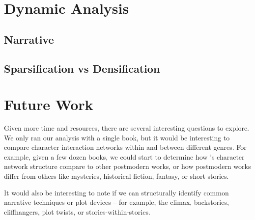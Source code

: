 \section{Dynamic Analysis}

\subsection{Narrative}

\subsection{Sparsification vs Densification}

\section{Future Work}

Given more time and resources, there are several interesting questions to explore. We only ran our analysis with a single book, but it would be interesting to compare character interaction networks within and between different genres. For example, given a few dozen books, we could start to determine how \infinitejest's character network structure compare to other postmodern works, or how postmodern works differ from others like mysteries, historical fiction, fantasy, or short stories.

It would also be interesting to note if we can structurally identify common narrative techniques or plot devices -- for example, the climax, backstories, cliffhangers, plot twists, or stories-within-stories.

